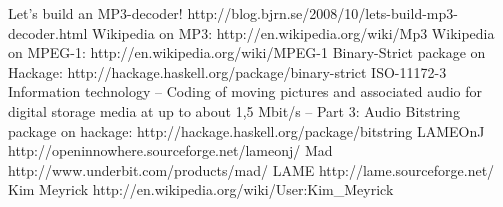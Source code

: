 \documentclass[a4paper,12pt]{article}
\begin{document}
\begin{thebibliography}{99}
        Let's build an MP3-decoder!
        http://blog.bjrn.se/2008/10/lets-build-mp3-decoder.html
        Wikipedia on MP3: http://en.wikipedia.org/wiki/Mp3
        Wikipedia on MPEG-1: http://en.wikipedia.org/wiki/MPEG-1
        Binary-Strict package on Hackage:
        http://hackage.haskell.org/package/binary-strict
        ISO-11172-3 Information technology -- Coding of moving pictures and
        associated audio for digital storage media at up to about 1,5 Mbit/s --
        Part 3: Audio
        Bitstring package on hackage:
        http://hackage.haskell.org/package/bitstring
       LAMEOnJ
       http://openinnowhere.sourceforge.net/lameonj/
       Mad
       http://www.underbit.com/products/mad/
       LAME
       http://lame.sourceforge.net/
       Kim Meyrick
       http://en.wikipedia.org/wiki/User:Kim\_Meyrick
\end{thebibliography}
\end{document}
